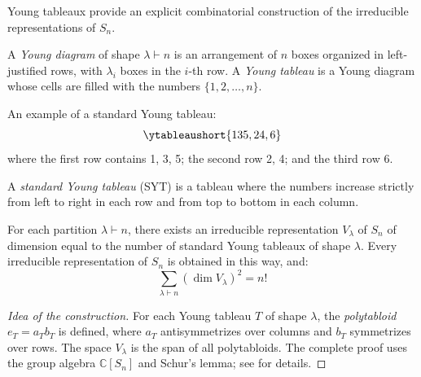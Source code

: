Young tableaux provide an explicit combinatorial construction of the irreducible representations of $S_n$.

\begin{definition}\label{def:young_diagram}
A \textit{Young diagram} of shape $\lambda \vdash n$ is an arrangement of $n$ boxes organized in left-justified rows, with $\lambda_i$ boxes in the $i$-th row. A \textit{Young tableau} is a Young diagram whose cells are filled with the numbers $\{1, 2, \ldots, n\}$.
\end{definition}

\begin{example}[Young Tableau for $\lambda = (3,2,1) \vdash 6$]
An example of a standard Young tableau:
\begin{equation*}
\ytableaushort{135,24,6}
\end{equation*}
where the first row contains 1, 3, 5; the second row 2, 4; and the third row 6.
\end{example}

\begin{definition}\label{def:standard_young_tableau}
A \textit{standard Young tableau} (SYT) is a tableau where the numbers increase strictly from left to right in each row and from top to bottom in each column.
\end{definition}

\begin{theorem}\label{thm:irrep_construction_sn}
For each partition $\lambda \vdash n$, there exists an irreducible representation $V_\lambda$ of $S_n$ of dimension equal to the number of standard Young tableaux of shape $\lambda$. Every irreducible representation of $S_n$ is obtained in this way, and:
\begin{equation}
\sum_{\lambda \vdash n} (\dim V_\lambda)^2 = n!
\end{equation}
\end{theorem}

\begin{proof}[Idea of the construction]
For each Young tableau $T$ of shape $\lambda$, the \textit{polytabloid} $e_T = a_T b_T$ is defined, where $a_T$ antisymmetrizes over columns and $b_T$ symmetrizes over rows. The space $V_\lambda$ is the span of all polytabloids. The complete proof uses the group algebra $\mathbb{C}[S_n]$ and Schur's lemma; see \citep{fulton1997young} for details.
\end{proof}

